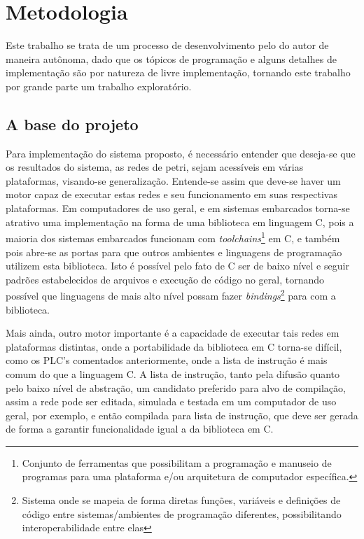 \chapter{Metodologia}

Este trabalho se trata de um processo de desenvolvimento pelo do autor de maneira autônoma, dado que os tópicos de programação e alguns detalhes de implementação são por natureza de livre implementação, tornando este trabalho por grande parte um trabalho exploratório. 

\section{A base do projeto}

Para implementação do sistema proposto, é necessário entender que deseja-se que os resultados do sistema, as redes de petri, sejam acessíveis em várias plataformas, visando-se generalização. Entende-se assim que deve-se haver um motor capaz de executar estas redes e seu funcionamento em suas respectivas plataformas. Em computadores de uso geral, e em sistemas embarcados torna-se atrativo uma implementação na forma de uma biblioteca em linguagem C, pois a maioria dos sistemas embarcados funcionam com \textit{toolchains}\footnote{Conjunto de ferramentas que possibilitam a programação e manuseio de programas para uma plataforma e/ou arquitetura de computador específica.} em C, e também pois abre-se as portas para que outros ambientes e linguagens de programação utilizem esta biblioteca. Isto é possível pelo fato de C ser de baixo nível e seguir padrões estabelecidos de arquivos e execução de código no geral, tornando possível que linguagens de mais alto nível possam fazer \textit{bindings}\footnote{Sistema onde se mapeia de forma diretas funções, variáveis e definições de código entre sistemas/ambientes de programação diferentes, possibilitando interoperabilidade entre elas} para com a biblioteca. 

Mais ainda, outro motor importante é a capacidade de executar tais redes em plataformas distintas, onde a portabilidade da biblioteca em C torna-se difícil, como os PLC's comentados anteriormente, onde a lista de instrução é mais comum do que a linguagem C. A lista de instrução, tanto pela difusão quanto pelo baixo nível de abstração, um candidato preferido para alvo de compilação, assim a rede pode ser editada, simulada e testada em um computador de uso geral, por exemplo, e então compilada para lista de instrução, que deve ser gerada de forma a garantir funcionalidade igual a da biblioteca em C.

